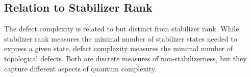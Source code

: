 \subsection{Relation to Stabilizer Rank}

The defect complexity is related to but distinct from stabilizer rank. While stabilizer rank measures the minimal number of stabilizer states needed to express a given state, defect complexity measures the minimal number of topological defects. Both are discrete measures of non-stabilizerness, but they capture different aspects of quantum complexity.
